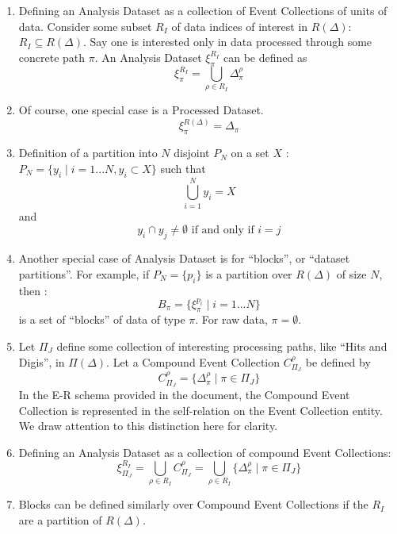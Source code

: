 \documentclass{cmspaper}
\begin{document}
\begin{enumerate}

\item Defining an Analysis Dataset as a collection of Event Collections of units of data.  
Consider some
subset $R_I$ of data indices of interest in $R(\Delta)$:  $R_I \subseteq R(\Delta)$.
Say one is interested only in 
data processed through some concrete path $\pi$.  An Analysis Dataset $\xi_{\pi}^{R_I}$
can be defined as 
\begin{equation}
\xi_{\pi}^{R_I} = \bigcup_{\rho \in R_I} \Delta_{\pi}^{\rho}
\end{equation}

\item Of course, one special case is a Processed Dataset. 
\begin{equation} 
\xi_{\pi}^{R(\Delta)} = \Delta_{\pi}
\end{equation}


\item Definition of a partition into $N$ disjoint $P_N$ on a set $X$ : 
$ P_N = \{ y_i \mid i = 1...N, y_i \subset X \} $ such that 
\begin{equation}
\bigcup_{i=1}^N y_i = X
\end{equation} 
and 
\begin{equation} 
y_i \cap y_j \neq \emptyset \mbox{ if and only if } i = j
\end{equation}
 
\item  Another special case of Analysis Dataset 
is for ``blocks'', or ``dataset partitions''.  For example, if
$P_N = \{ p_i \}$ is a partition over $R(\Delta)$ of size $N$, then : 
\begin{equation}
B_{\pi} = \{ \xi_{\pi}^{p_i} \mid i = 1...N\}
\end{equation}
is a set of ``blocks'' of data of type $\pi$.  For raw data, $\pi = \emptyset$.


\item Let $\Pi_J$ define some collection of interesting processing paths, like ``Hits and Digis'', 
in $\Pi(\Delta)$.  Let a Compound Event Collection $C_{\Pi_J}^{\rho}$ be defined by
\begin{equation}
C_{\Pi_J}^{\rho} = \{ \Delta_{\pi}^{\rho} \mid \pi \in \Pi_J \}
\end{equation}
In the E-R schema provided in the document, the Compound Event Collection is 
represented in the self-relation on the Event Collection entity.  We draw attention to 
this distinction here for clarity.

\item Defining an Analysis Dataset as a collection of compound Event Collections: 
\begin{equation}
\xi_{\Pi_J}^{R_I} = \bigcup_{\rho \in R_I} C_{\Pi_J}^{\rho} = \bigcup_{\rho \in R_I} \{ \Delta_{\pi}^{\rho} \mid \pi \in \Pi_J \}
\end{equation}

\item Blocks can be defined similarly over Compound Event Collections if the $R_I$ are a partition 
of $R(\Delta)$.

\end{enumerate}
\end{document}
